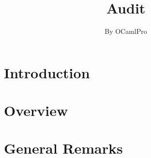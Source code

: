 \documentclass{report}
\newif\ifsolmodules
\newif\ifsolissues
\newif\ifsoldraft
\begin{document}
\title{Audit}
\author{By OCamlPro}
\maketitle
\tableofcontents
\ifsolissues
\listoffigures
\fi

\ifsoldraft
\chapter*{To edit this document}

In the report.tex file, choose:
\begin{itemize}
\item{\bf \textbackslash{}soldraftfalse} to remove draft mode (watermarks, advises)
\item{\bf \textbackslash{}solmodulestrue} to display modules by chapter instead of contracts
\item{\bf \textbackslash{}soltablestrue} to display tables for parameters and returns
\item{\bf \textbackslash{}solissuesfalse} to remove the table of issues
\end{itemize}

Issues can be entered with:
\begin{itemize}
\item{\bf \textbackslash{}issueCritical\{title\}\{text\}}
\item{\bf \textbackslash{}issueMajor\{title\}\{text\}}
\item{\bf \textbackslash{}issueMinor\{title\}\{text\}}
\end{itemize}
\fi

\chapter{Introduction}
\label{chapter:introduction}


\chapter{Overview}
\label{chapter:overview}


\chapter{General Remarks}
\label{chapter:general}




\ifsolmodules

\else

\fi
\end{document}
